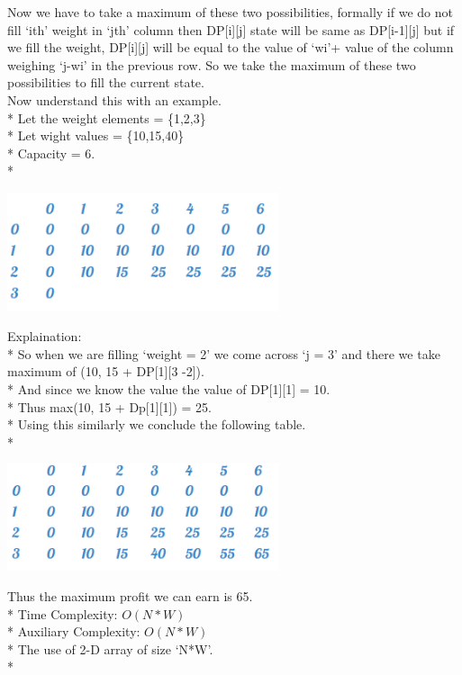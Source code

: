 \documentclass[12pt]{book}
\begin{document}
Now we have to take a maximum of these two possibilities, formally if we do not fill ‘ith’ weight in ‘jth’ column then DP[i][j] state will be same as DP[i-1][j] but if we fill the weight, DP[i][j] will be equal to the value of ‘wi’+ value of the column weighing ‘j-wi’ in the previous row. So we take the maximum of these two possibilities to fill the current state. \\
\newline
Now understand this with an example.\\*
Let the weight elements = \{1,2,3\}\\*
Let wight values = \{10,15,40\}\\*
Capacity = 6.\\*
\begin{center}
    \includegraphics[width = 8cm]{nbGvAsc.png}    
\end{center}
Explaination:\\*
So when we are filling ‘weight = 2’ we come across ‘j = 3’ and there we take maximum of (10, 15 + DP[1][3 -2]).\\*
\newline
And since we know the value the value of DP[1][1] = 10. \\*
Thus max(10, 15 + Dp[1][1]) = 25.\\*
Using this similarly we conclude the following table.\\*
\begin{center}
    \includegraphics[width = 8cm]{ilDYzPq.png}    
\end{center}
Thus the maximum profit we can earn is 65.\\*
\newline
Time Complexity:
$O(N*W)$ \\*
Auxiliary Complexity:
$O(N*W)$ \\*
The use of 2-D array of size ‘N*W’.\\*
\end{document}
